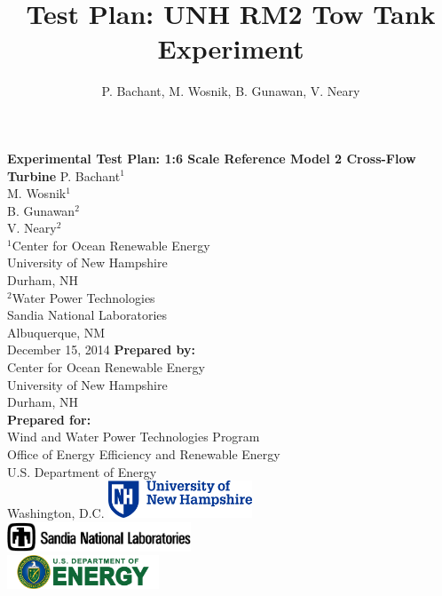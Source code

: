 \documentclass[12pt,letterpaper]{scrreprt}
\author{P. Bachant, M. Wosnik, B. Gunawan, V. Neary}
\title{Test Plan: UNH RM2 Tow Tank Experiment}
\begin{document}
\begin{titlepage}
    \centering
    \addtolength{\topmargin}{.5in}
    {\bfseries \large
        Experimental Test Plan: 1:6 Scale Reference Model 2 Cross-Flow Turbine
    }  
    \vskip1cm
    P. Bachant$^1$\\
    M. Wosnik$^1$\\
    B. Gunawan$^2$\\
    V. Neary$^2$\\  
    \vfill
    $^1$Center for Ocean Renewable Energy \\
    University of New Hampshire \\
    Durham, NH \\
    \vspace{0.1in}
    $^2$Water Power Technologies \\
    Sandia National Laboratories \\
    Albuquerque, NM \\
    \vfill
    December 15, 2014
    \vfill
    \textbf{Prepared by:}\\
    Center for Ocean Renewable Energy\\
    University of New Hampshire\\
    Durham, NH\\
    \vspace{0.1in}
    \textbf{Prepared for:} \\
    Wind and Water Power Technologies Program \\
    Office of Energy Efficiency and Renewable Energy \\
    U.S. Department of Energy \\
    Washington, D.C.
    \vfill
    \includegraphics[width=0.32\textwidth]{Figures/unhlogo} \\
    \vspace{0.1in}
    \includegraphics[width=0.41\textwidth]{Figures/snllogo} \\
    \vspace{0.1in}
    \includegraphics[width=0.34\textwidth]{Figures/doelogo}
    \vfill
\end{titlepage}
\end{document}
